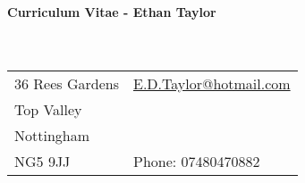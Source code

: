 \documentclass[letterpaper,10pt,oneside]{article}
\begin{document}

\noindent  \LARGE{\textbf{Curriculum Vitae - Ethan Taylor}}  \\
\vspace{-2ex}
\hrulefill \\[2mm]
\normalsize
\\[-3mm]


\begin{tabular}{l l}
36 Rees Gardens    & \hspace{1in} \href{mailto:E.D.Taylor@hotmail.com}{E.D.Taylor@hotmail.com} \\
 Top Valley  \\
 Nottingham  \\
 NG5 9JJ & \hspace{1in} Phone: 07480470882 \\
\end{tabular}
\\[5mm]
\end{document}
